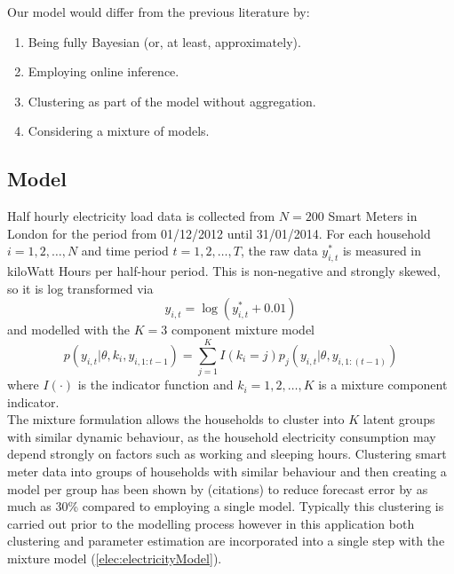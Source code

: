 \documentclass[12pt,a4paper]{article}\usepackage[]{graphicx}\usepackage[]{color}
\begin{document}
Our model would differ from the previous literature by:
\begin{enumerate}
\item Being fully Bayesian (or, at least, approximately).
\item Employing online inference.
\item Clustering as part of the model without aggregation.
\item Considering a mixture of models.
\end{enumerate}

\subsection{Model}

Half hourly electricity load data is collected from $N = 200$ Smart Meters in London for the period from 01/12/2012 until 31/01/2014. For each household $i = 1, 2, \ldots, N$ and time period $t = 1, 2, \ldots, T$, the raw data $y_{i, t}^*$ is measured in kiloWatt Hours per half-hour period. This is non-negative and strongly skewed, so it is log transformed via
\begin{equation}
\label{elec:logY}
y_{i, t} = \log(y_{i, t}^* + 0.01)
\end{equation}
and modelled with the $K = 3$ component mixture model
\begin{equation}
\label{elec:electricityModel}
p(y_{i, t} | \theta, k_i, y_{i, 1:t-1}) = \sum_{j=1}^K I(k_{i} = j) p_{j}(y_{i, t} | \theta, y_{i, 1:(t-1)})
\end{equation}
where $I(\cdot)$ is the indicator function and $k_i = 1, 2, \ldots, K$ is a mixture component indicator.
\\

The mixture formulation allows the households to cluster into $K$ latent groups with similar dynamic behaviour, as the household electricity consumption may depend strongly on factors such as working and sleeping hours. Clustering smart meter data into groups of households with similar behaviour and then creating a model per group has been shown by (citations) to reduce forecast error by as much as 30\% compared to employing a single model. Typically this clustering is carried out prior to the modelling process however in this application both clustering and parameter estimation are incorporated into a single step with the mixture model (\ref{elec:electricityModel}).
\\
\end{document}
